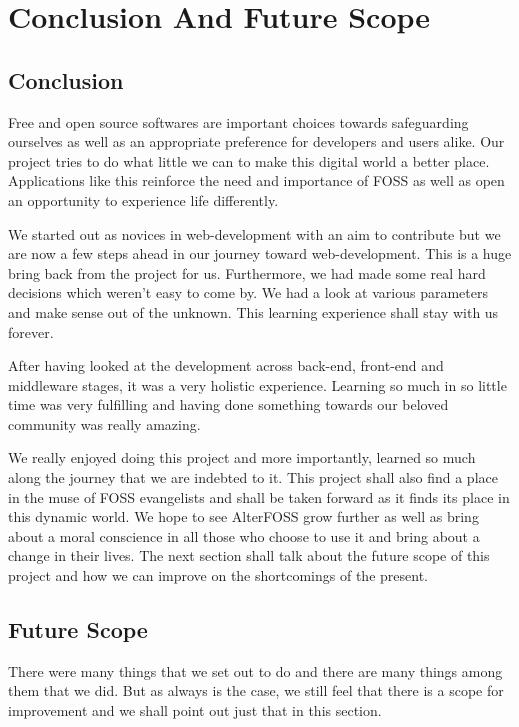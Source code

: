 \chapter{Conclusion And Future Scope}

\section{Conclusion}

Free and open source softwares are important choices towards safeguarding ourselves as well as an appropriate preference for developers and users alike. Our project tries to do what little we can to make this digital world a better place. Applications like this reinforce the need and importance of FOSS as well as open an opportunity to experience life differently. 

We started out as novices in web-development with an aim to contribute but we are now a few steps ahead in our journey toward web-development. This is a huge bring back from the project for us. Furthermore, we had made some real hard decisions which weren't easy to come by. We had a look at various parameters and make sense out of the unknown. This learning experience shall stay with us forever.

After having looked at the development across back-end, front-end and middleware stages, it was a very holistic experience. Learning so much in so little time was very fulfilling and having done something towards our beloved community was really amazing.

We really enjoyed doing this project and more importantly, learned so much along the journey that we are indebted to it. This project shall also find a place in the muse of FOSS evangelists and shall be taken forward as it finds its place in this dynamic world. We hope to see AlterFOSS grow further as well as bring about a moral conscience in all those who choose to use it and bring about a change in their lives. The next section shall talk about the future scope of this project and how we can improve on the shortcomings of the present.

\section{Future Scope}
There were many things that we set out to do and there are many things among them that we did. But as always is the case, we still feel that there is a scope for improvement and we shall point out just that in this section.

